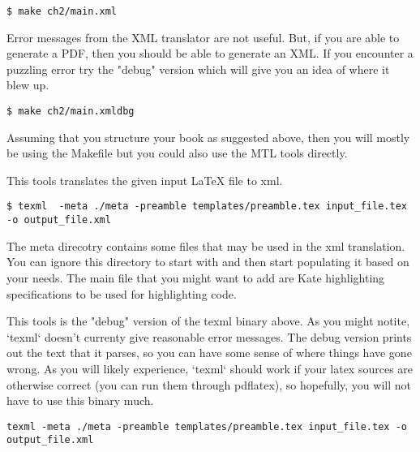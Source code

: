 \begin{lstlisting}
$ make ch2/main.xml
\end{lstlisting}

Error messages from the XML translator are not useful.  But, if you are able to generate a PDF, then you should be able to generate an XML. If you encounter a puzzling error try the "debug" version which will give you an idea of where it blew up.   

\begin{lstlisting}
$ make ch2/main.xmldbg
\end{lstlisting}

Assuming that you structure your book as suggested above, then you will mostly be using the Makefile but you could also use the MTL tools directly. 

\begin{gram}[texml]  
This tools translates the given input LaTeX file to xml.

\begin{lstlisting}
$ texml  -meta ./meta -preamble templates/preamble.tex input_file.tex -o output_file.xml
\end{lstlisting}

The meta direcotry contains some files that may be used in the xml translation.  You can ignore this directory to start with and then start populating it based on your needs.  The main file that you might want to add are Kate highlighting specifications to be used for highlighting code.
\end{gram}

\begin{gram} 
This tools is the "debug" version of the texml binary above. As you might notite, `texml` doesn't currenty give reasonable error messages.  The debug version prints out the text that it parses, so you can have some sense of where things have gone wrong.  As you will likely experience, `texml` should work if your latex sources are otherwise correct (you can run them through pdflatex), so hopefully, you will not have to use this binary much.  

\begin{lstlisting}
texml -meta ./meta -preamble templates/preamble.tex input_file.tex -o output_file.xml
\end{lstlisting}
\end{gram}


